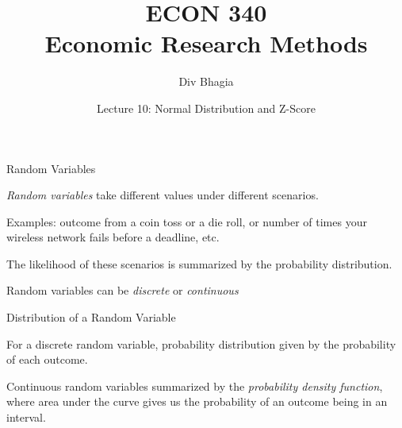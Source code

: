 \documentclass{./../div_teaching_slides}
\begin{document}
\title{ECON 340 \\ Economic Research Methods}
\author{Div Bhagia}
\date{Lecture 10: Normal Distribution and Z-Score}

\begin{frame}
\maketitle
\end{frame}


\begin{frame}{Random Variables}
\begin{witemize}
  \item \textit{Random variables} take different values under different scenarios.
  \item Examples:  outcome from a coin toss or a die roll, or number of times your wireless network fails before a deadline, etc.
  \item The likelihood of these scenarios is summarized by the probability distribution.
  \item Random variables can be \textit{discrete} or \textit{continuous}
\end{witemize}
\end{frame}

\begin{frame}{Distribution of a Random Variable}
\begin{witemize}
  \item For a discrete random variable, probability distribution given by the probability of each outcome.
  \item Continuous random variables summarized by the \textit{probability density function}, where area under the curve gives us the probability of an outcome being in an interval. 
 \end{witemize}
\end{frame}
\end{document}

